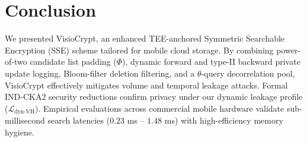 \documentclass[runningheads]{llncs}
\begin{document}
\section{Conclusion}
We presented VisioCrypt, an enhanced TEE-anchored Symmetric Searchable Encryption (SSE) scheme tailored for mobile cloud storage. By combining power-of-two candidate list padding ($\Phi$), dynamic forward and type-II backward private update logging, Bloom-filter deletion filtering, and a $\theta$-query decorrelation pool, VisioCrypt effectively mitigates volume and temporal leakage attacks. Formal IND-CKA2 security reductions confirm privacy under our dynamic leakage profile ($\mathcal{L}_{\text{dyn-VH}}$). Empirical evaluations across commercial mobile hardware validate sub-millisecond search latencies ($0.23$ ms -- $1.48$ ms) with high-efficiency memory hygiene.



\end{document}
